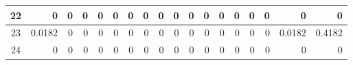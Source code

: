 \begin{table}[ht]
\begin{adjustbox}{width = \textwidth, center}
\begin{tabular}{|c|r|r|r|r|r|r|r|r|r|r|r|r|r|r|r|r|r|}
            \rowcolor[HTML]{FFFFFF} 
            \cellcolor[HTML]{CFE2F3}22                           & 0                                              & 0                                              & 0                                              & 0                                              & 0                                              & 0                                              & 0                                              & 0                                               & 0                                               & 0                                               & 0                                               & 0                                               & 0                                               & 0                                               & 0                                               & \cellcolor[HTML]{D9D2E9}0                                                             & \cellcolor[HTML]{D9D2E9}0                                                                 \\ \hline
            \rowcolor[HTML]{FFFFFF} 
            \cellcolor[HTML]{CFE2F3}23                           & \cellcolor[HTML]{C7E9D8}0.0182                 & 0                                              & 0                                              & 0                                              & 0                                              & 0                                              & 0                                              & 0                                               & 0                                               & 0                                               & 0                                               & 0                                               & 0                                               & 0                                               & 0                                               & \cellcolor[HTML]{D9D2E9}0.0182                                                        & \cellcolor[HTML]{D9D2E9}0.4182                                                            \\ \hline
            \rowcolor[HTML]{FFFFFF} 
            \cellcolor[HTML]{CFE2F3}24                           & 0                                              & 0                                              & 0                                              & 0                                              & 0                                              & 0                                              & 0                                              & 0                                               & 0                                               & 0                                               & 0                                               & 0                                               & 0                                               & 0                                               & 0                                               & \cellcolor[HTML]{D9D2E9}0                                                             & \cellcolor[HTML]{D9D2E9}0                                                                 \\ \hline

\end{tabular}
\end{adjustbox}
\end{table}
